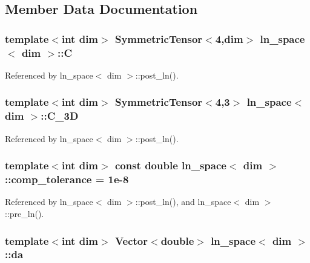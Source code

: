 \subsection{Member Data Documentation}
\subsubsection[{\texorpdfstring{C}{C}}]{\setlength{\rightskip}{0pt plus 5cm}template$<$int dim$>$ Symmetric\+Tensor$<$4,dim$>$ {\bf ln\+\_\+space}$<$ dim $>$\+::C}\hypertarget{classln__space_a03b61855dbad8c954ace5700ee4a3769}{}\label{classln__space_a03b61855dbad8c954ace5700ee4a3769}


Referenced by ln\+\_\+space$<$ dim $>$\+::post\+\_\+ln().

\subsubsection[{\texorpdfstring{C\+\_\+3D}{C_3D}}]{\setlength{\rightskip}{0pt plus 5cm}template$<$int dim$>$ Symmetric\+Tensor$<$4,3$>$ {\bf ln\+\_\+space}$<$ dim $>$\+::C\+\_\+3D}\hypertarget{classln__space_a73ba46c443138c59b8eaa1c4561b7dc6}{}\label{classln__space_a73ba46c443138c59b8eaa1c4561b7dc6}


Referenced by ln\+\_\+space$<$ dim $>$\+::post\+\_\+ln().

\subsubsection[{\texorpdfstring{comp\+\_\+tolerance}{comp_tolerance}}]{\setlength{\rightskip}{0pt plus 5cm}template$<$int dim$>$ const double {\bf ln\+\_\+space}$<$ dim $>$\+::comp\+\_\+tolerance = 1e-\/8\hspace{0.3cm}{\ttfamily [private]}}\hypertarget{classln__space_adb90c475844ad73f0ff8b40e80900180}{}\label{classln__space_adb90c475844ad73f0ff8b40e80900180}


Referenced by ln\+\_\+space$<$ dim $>$\+::post\+\_\+ln(), and ln\+\_\+space$<$ dim $>$\+::pre\+\_\+ln().

\subsubsection[{\texorpdfstring{da}{da}}]{\setlength{\rightskip}{0pt plus 5cm}template$<$int dim$>$ Vector$<$double$>$ {\bf ln\+\_\+space}$<$ dim $>$\+::da\hspace{0.3cm}{\ttfamily [private]}}\hypertarget{classln__space_a8d65915eb5122e3c5941b7163af57306}{}\label{classln__space_a8d65915eb5122e3c5941b7163af57306}


